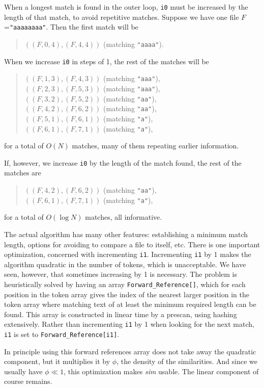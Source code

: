 \documentclass[a4paper,fleqn]{article}
\renewcommand{\sim}[0]{{\it sim}}
\newcommand{\cw}[1]{\texttt{#1}}
\begin{document}
When a longest match is found in the outer loop, \cw{i0} must be increased by
the length of that match, to avoid repetitive matches.
Suppose we have one file $F$=\cw{"aaaaaaaa"}.
Then the first match will be
\begin{quote}
$((F,0,4), (F,4,4))$ (matching \cw{"aaaa"}).
\end{quote}
When we increase \cw{i0} in steps of 1, the rest of the matches will be
\begin{quote}
$((F,1,3), (F,4,3))$ (matching \cw{"aaa"}), \\
$((F,2,3), (F,5,3))$ (matching \cw{"aaa"}), \\
$((F,3,2), (F,5,2))$ (matching \cw{"aa"}), \\
$((F,4,2), (F,6,2))$ (matching \cw{"aa"}), \\
$((F,5,1), (F,6,1))$ (matching \cw{"a"}), \\
$((F,6,1), (F,7,1))$ (matching \cw{"a"}),
\end{quote}
for a total of $O(N)$ matches, many of them repeating
earlier information.

If, however, we increase \cw{i0} by the length of the match found, the rest of
the matches are
\begin{quote}
$((F,4,2), (F,6,2))$ (matching \cw{"aa"}), \\
$((F,6,1), (F,7,1))$ (matching \cw{"a"}),
\end{quote}
for a total of $O(\log N)$ matches, all informative.

The actual algorithm has many other features: establishing a minimum match
length, options for avoiding to compare a file to itself, etc.
There is one important optimization, concerned with incrementing \cw{i1}.
Incrementing \cw{i1} by 1 makes the algorithm quadratic in the number of
tokens, which is unacceptable.
We have seen, however, that sometimes increasing by 1 is necessary.
The problem is heuristically solved by having
an array \cw{Forward\_Reference[]}, which for each position in the token array
gives the index of the nearest larger position in the token array where
matching text of at least the minimum required length can be found.
This array is constructed in linear time by a prescan,
using hashing extensively.
Rather than incrementing \cw{i1} by 1 when looking for the next match, \cw{i1}
is set to \cw{Forward\_Reference[i1]}.

In principle using this forward references array does not take away the
quadratic component, but it multiplies it by $\phi$, the density of the
similarities.
And since we usually have $\phi \ll 1$, this optimization makes {\sim}
usable.
The linear component of course remains.
\end{document}
